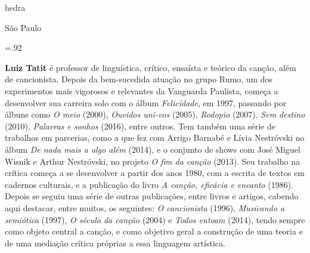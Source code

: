               \newfontfamily{}
              {\fontsize{30}{40}\selectfont \timesnewroman hedra}
              
              \medskip

              {\selectfont\minion\small
              São Paulo \quad\the\year}
\endgroup
\pagebreak

\begingroup 

\footnotesize\parindent0pt\parskip5pt\thispagestyle{empty} 
\vspace*{.1\textheight}\mbox{} \vfill
\baselineskip=.92\baselineskip
\thispagestyle{empty}

\textbf{Luiz Tatit} é professor de linguística, crítico, ensaísta e teórico da canção, além de cancionista. Depois da bem-sucedida atuação no grupo Rumo, um dos experimentos mais vigorosos e relevantes da Vanguarda Paulista, começa a desenvolver sua carreira solo com o álbum \textit{Felicidade}, em 1997, passando por álbuns como \textit{O meio} (2000), \textit{Ouvidos uni-vos} (2005), \textit{Rodopio} (2007), \textit{Sem destino} (2010), \textit{Palavras e sonhos} (2016), entre outros. Tem também uma série de trabalhos em parcerias, como a que fez com Arrigo Barnabé e Lívia Nestróvski no álbum \textit{De nada mais a algo além} (2014), e o conjunto de shows com José Miguel Wisnik e Arthur Nestróvski, no projeto \textit{O fim da canção} (2013). Seu trabalho na crítica começa a se desenvolver a partir dos anos 1980, com a escrita de textos em cadernos culturais, e a publicação do livro \textit{A canção, eficácia e encanto} (1986). Depois se seguiu uma série de outras publicações, entre livros e artigos, cabendo aqui destacar, entre muitos, os seguintes: \textit{O cancionista} (1996), \textit{Musicando a semiótica} (1997), \textit{O século da canção} (2004) e \textit{Todos entoam} (2014), tendo sempre como objeto central a canção, e como objetivo geral a construção de uma teoria e de uma mediação crítica próprias a essa linguagem artística.

